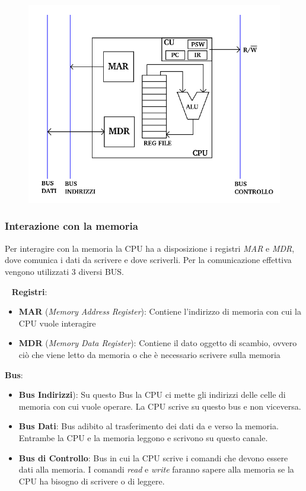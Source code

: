 \documentclass[12pt,oneside]{book}
\begin{document}
\begin{figure}[h]
    \centering
    \includegraphics[scale=0.5]{cpu_didattica_schema}
\end{figure}
\newpage
\subsubsection{Interazione con la memoria}
Per interagire con la memoria la CPU ha a disposizione i registri \emph{MAR} e \emph{MDR}, dove comunica
i dati da scrivere e dove scriverli. Per la comunicazione effettiva vengono utilizzati 3 diversi BUS.

~\newline
\textbf{Registri}:
\begin{itemize}
    \item \textbf{MAR} (\emph{Memory Address Register}): Contiene l'indirizzo di memoria con cui la CPU vuole interagire
    \item \textbf{MDR} (\emph{Memory Data Register}): Contiene il dato oggetto di scambio, ovvero ciò che viene letto da memoria o che è necessario scrivere sulla memoria
\end{itemize}

\noindent \textbf{Bus}:
\begin{itemize}
    \item \textbf{Bus Indirizzi}): Su questo Bus la CPU ci mette gli indirizzi delle celle di memoria con cui vuole operare. La CPU scrive su questo bus e non viceversa.
    \item \textbf{Bus Dati}: Bus adibito al trasferimento dei dati da e verso la memoria. Entrambe la CPU e la memoria leggono e scrivono su questo canale.
    \item \textbf{Bus di Controllo}: Bus in cui la CPU scrive i comandi che devono essere dati alla memoria. I comandi \emph{read} e \emph{write} faranno sapere alla memoria
          se la CPU ha bisogno di scrivere o di leggere.
\end{itemize}
\end{document}
